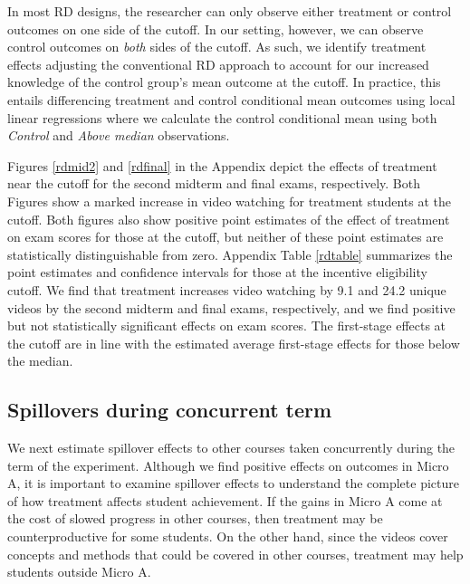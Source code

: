 \documentclass[12pt]{article}
\begin{document}
In most RD designs, the researcher can only observe either treatment or control outcomes on one side of the cutoff. In our setting, however, we can observe control outcomes on \textit{both} sides of the cutoff. As such, we identify treatment effects adjusting the conventional RD approach to account for our increased knowledge of the control group's mean outcome at the cutoff. In practice, this entails differencing treatment and control conditional mean outcomes using local linear regressions where we calculate the control conditional mean using both \textit{Control} and \textit{Above median} observations.

Figures \ref{rdmid2} and \ref{rdfinal} in the Appendix depict the effects of treatment near the cutoff for the second midterm and final exams, respectively. Both Figures show a marked increase in video watching for treatment students at the cutoff. Both figures also show positive point estimates of the effect of treatment on exam scores for those at the cutoff, but neither of these point estimates are statistically distinguishable from zero. Appendix Table \ref{rdtable} summarizes the point estimates and confidence intervals for those at the incentive eligibility cutoff. We find that treatment increases video watching by 9.1 and 24.2 unique videos by the second midterm and final exams, respectively, and we find positive but not statistically significant effects on exam scores. The first-stage effects at the cutoff are in line with the estimated average first-stage effects for those below the median.



\subsection{Spillovers during concurrent term}

We next estimate spillover effects to other courses taken concurrently during the term of the experiment. Although we find positive effects on outcomes in Micro A, it is important to examine spillover effects to understand the complete picture of how treatment affects student achievement. If the gains in Micro A come at the cost of slowed progress in other courses, then treatment may be counterproductive for some students. On the other hand, since the videos cover concepts and methods that could be covered in other courses, treatment may help students outside Micro A.
\end{document}
